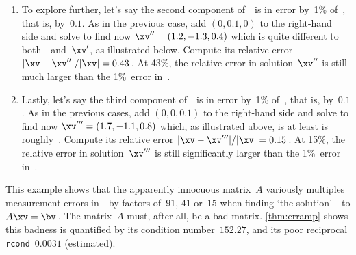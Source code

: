 \begin{example}
\begin{enumerate}
\item To explore further, let's say the second component of~\bv\ is in error by~1\% of~\bv, that is, by~\(0.1\).
As in the previous case, add \((0,0.1,0)\) to the right-hand side and solve to find now \(\xv''=(1.2,-1.3,0.4)\) which is quite different to both~\xv\ and~\(\xv'\), as illustrated below.
Compute its relative error \(|\xv-\xv''|/|\xv|=0.43\)\,.
At 43\%, the relative error in solution~\(\xv''\) is still much larger than the 1\%~error in~\bv.
\begin{center}
\end{center}

\item Lastly, let's say the third component of~\bv\ is in error by~1\% of~\bv, that is, by~\(0.1\).
As in the previous cases, add \((0,0,0.1)\) to the right-hand side and solve to find now \(\xv'''=(1.7,-1.1,0.8)\) which, as illustrated above, is at least is roughly~\xv.
Compute its relative error \(|\xv-\xv'''|/|\xv|=0.15\)\,.
At 15\%, the relative error in solution~\(\xv'''\) is still significantly larger than the 1\%~error in~\bv.

\end{enumerate}
This example shows that the apparently innocuous matrix~\(A\) variously multiples measurement errors in~\bv\ by factors of~\(91\), \(41\) or~\(15\) when finding `the solution'~\xv\ to \(A\xv=\bv\)\,.
The matrix~\(A\) must, after all, be a bad matrix.
\autoref{thm:erramp} shows this badness is quantified by its  condition number~\(152.27\), and its poor reciprocal \verb|rcond|~\(0.0031\) (estimated). 
\end{example}





